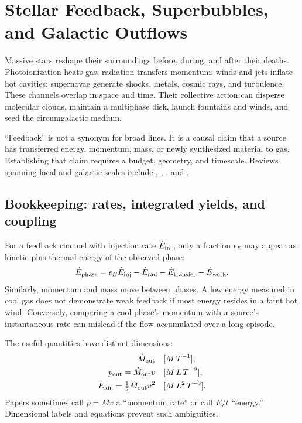 
\chapter{Stellar Feedback, Superbubbles, and Galactic Outflows}
\label{chap:feedback-outflows}

Massive stars reshape their surroundings before, during, and after their deaths.
Photoionization heats gas; radiation transfers momentum; winds and jets inflate hot
cavities; supernovae generate shocks, metals, cosmic rays, and turbulence.  These
channels overlap in space and time.  Their collective action can disperse molecular
clouds, maintain a multiphase disk, launch fountains and winds, and seed the
circumgalactic medium.

``Feedback'' is not a synonym for broad lines.  It is a causal claim that a source has
transferred energy, momentum, mass, or newly synthesized material to gas.  Establishing
that claim requires a budget, geometry, and timescale.  Reviews spanning local and
galactic scales include \citet{McKeeOstriker2007}, \citet{NaabOstriker2017},
\citet{VeilleuxCecilBlandHawthorn2005}, and
\citet{VeilleuxMaiolinoBolattoAalto2020}.

\section{Bookkeeping: rates, integrated yields, and coupling}

For a feedback channel with injection rate $\dot E_{\rm inj}$, only a fraction
$\epsilon_E$ may appear as kinetic plus thermal energy of the observed phase:
\begin{equation}
 \dot E_{\rm phase}=\epsilon_E\dot E_{\rm inj}
 -\dot E_{\rm rad}-\dot E_{\rm transfer}-\dot E_{\rm work}.
 \label{eq:feedback-energy-budget}
\end{equation}
Similarly, momentum and mass move between phases.  A low energy measured in cool gas
does not demonstrate weak feedback if most energy resides in a faint hot wind.
Conversely, comparing a cool phase's momentum with a source's instantaneous rate can
mislead if the flow accumulated over a long episode.

The useful quantities have distinct dimensions:
\begin{align}
 \dot M_{\rm out} &\quad [M\,T^{-1}],\\
 \dot p_{\rm out}=\dot M_{\rm out}v &\quad [M\,L\,T^{-2}],\\
 \dot E_{\rm kin}=\tfrac12\dot M_{\rm out}v^2 &\quad [M\,L^2\,T^{-3}].
 \label{eq:outflow-fluxes}
\end{align}
Papers sometimes call $p=Mv$ a ``momentum rate'' or call $E/t$ ``energy.''  Dimensional
labels and equations prevent such ambiguities.

